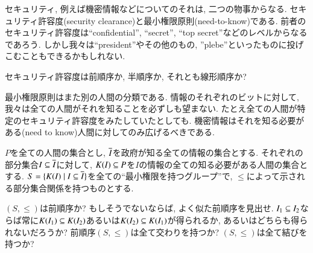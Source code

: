 セキュリティ, 例えば機密情報などについてのそれは, 二つの物事からなる. セキュリティ許容度(security clearance)と最小権限原則(need-to-know)である. 前者のセキュリティ許容度は``confidential'', ``secret'', ``top secret''などのレベルからなるであろう. しかし我々は``president''やその他のもの, ''plebe''といったものに投げこむこともできるかもしれない. 

\begin{exercise}
セキュリティ許容度は前順序か, 半順序か, それとも線形順序か?
\end{exercise}


最小権限原則はまた別の人間の分類である. 情報のそれぞれのビットに対して, 我々は全ての人間がそれを知ることを必ずしも望まない. たとえ全ての人間が特定のセキュリティ許容度をみたしていたとしても. 機密情報はそれを知る必要がある(need to know)人間に対してのみ広げるべきである.

\begin{exercise}

$P$を全ての人間の集合とし, $\ol{I}$を政府が知る全ての情報の集合とする. それぞれの部分集合$I\ss\ol{I}$に対して, $K(I)\ss P$を$I$の情報の全ての知る必要がある人間の集合とする. $S=\{K(I)\|I\ss\ol{I}\}$を全ての``最小権限を持つグループ''で, $\leq$によって示される部分集合関係を持つものとする. 


\sexc $(S,\leq)$は前順序か? もしそうでないならば, よく似た前順序を見出せ.
\next $I_1\ss I_2$ならば常に$K(I_1)\ss K(I_2)$あるいは$K(I_2)\ss K(I_1)$が得られるか, あるいはどちらも得られないだろうか?
\next 前順序$(S,\leq)$は全て交わりを持つか?
\next $(S,\leq)$は全て結びを持つか?
\endsexc
\end{exercise}

